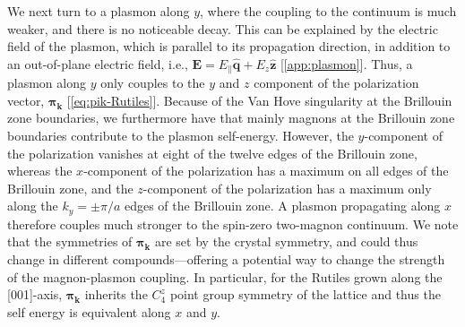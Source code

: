 \documentclass[aps,prb,reprint,twocolumns,superscriptaddress,nofootinbib]{revtex4-2}
\begin{document}
	We next turn to a plasmon along ${y}$, where the coupling to the continuum is much weaker, and there is no noticeable decay. 
	This can be explained by the electric field of the plasmon, which is parallel to its propagation direction, in addition to an out-of-plane electric field, i.e., $\bm E =  E_{\parallel}\hat{\bm q} + E_z \hat{\bm z}$ [\cref{app:plasmon}]. Thus, a plasmon along ${y}$ only couples to the $y$ and $z$ component of the polarization vector, $\bm\pi_{\bm k}$ [\cref{eq:pik-Rutiles}]. Because of the Van Hove singularity at the Brillouin zone boundaries, we furthermore have that mainly magnons at the Brillouin zone boundaries contribute to the plasmon self-energy. However, the $y$-component of the polarization vanishes at eight of the twelve edges of the Brillouin zone, whereas the $x$-component of the polarization has a maximum on all edges of the Brillouin zone, and the $z$-component of the polarization has a maximum only along the $k_y=\pm \pi/a$ edges of the Brillouin zone. A plasmon propagating along $x$ therefore couples much stronger to the spin-zero two-magnon continuum. We note that the symmetries of $\bm\pi_{\bm k}$ are set by the crystal symmetry, and could thus change in different compounds---offering a potential way to change the strength of the magnon-plasmon coupling. In particular, for the Rutiles grown along the [001]-axis, $\bm\pi_{\bm k}$ inherits the $C_4^z$ point group symmetry of the lattice and thus the self energy is equivalent along $x$ and $y$.
\end{document}
